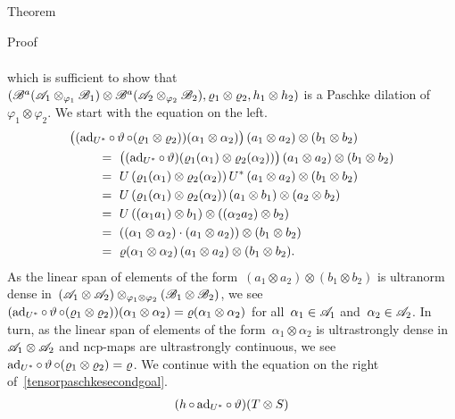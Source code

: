 \documentclass[b]{subfiles}
\begin{document}
\begin{parsec}
\begin{point}{Theorem}
\begin{point}{Proof}
\begin{point}
\begin{align}
    \end{align}
    which is sufficient to show that~$(
        \mathscr{B}^a(\mathscr{A}_1 \otimes_{\varphi_1} \mathscr{B}_1)
        \otimes \mathscr{B}^a(\mathscr{A}_2 \otimes_{\varphi_2} \mathscr{B}_2),
        \varrho_1 \otimes \varrho_2,
        h_1 \otimes h_2)$
    is a Paschke dilation of~$\varphi_1 \otimes \varphi_2$.
    We start with the equation on the left.
\begin{align*}
    &\bigl((\ad_{U^*} \after \vartheta \after  (\varrho_1 \otimes \varrho_2)) (\alpha_1 \otimes \alpha_2)\bigr)
    \, (a_1 \otimes a_2) \otimes (b_1 \otimes b_2) \\
    &\qquad \ = \ 
    \bigl((\ad_{U^*} \after \vartheta) (\varrho_1 (\alpha_1)\otimes \varrho_2(\alpha_2)) \bigr)
    \, (a_1 \otimes a_2) \otimes (b_1 \otimes b_2) \\
    &\qquad \ = \ 
    U \,(\varrho_1 (\alpha_1)\otimes \varrho_2(\alpha_2)) \, U^*
    \, (a_1 \otimes a_2) \otimes (b_1 \otimes b_2) \\
    &\qquad \ = \ 
    U \,(\varrho_1 (\alpha_1)\otimes \varrho_2(\alpha_2)) 
    \, (a_1 \otimes b_1) \otimes (a_2 \otimes b_2) \\
    &\qquad \ = \ 
    U \,  ((\alpha_1 a_1) \otimes b_1) \otimes ((\alpha_2 a_2) \otimes b_2) \\
    &\qquad \ = \ 
     ((\alpha_1 \otimes \alpha_2)\cdot (a_1 \otimes a_2)) \otimes (b_1 \otimes b_2) \\
    &\qquad \ = \ 
    \varrho(\alpha_1 \otimes\alpha_2) \,(a_1 \otimes a_2) \otimes (b_1 \otimes b_2).
\end{align*}
As the linear span of
    elements of the form~$(a_1 \otimes a_2) \otimes (b_1 \otimes b_2)$
    is ultranorm dense in~$(\mathscr{A}_1 \otimes \mathscr{A}_2)
                            \otimes_{\varphi_1 \otimes \varphi_2}
                            (\mathscr{B}_1 \otimes \mathscr{B}_2) $,
    we see~$(\mathrm{ad}_{U^*} \mathop{\circ} \vartheta \mathop{\circ} (\varrho_1 \otimes \varrho_2))
            (\alpha_1 \otimes \alpha_2)
            = \varrho(\alpha_1 \otimes \alpha_2)$
            for all~$\alpha_1\in\mathscr{A}_1$ and~$\alpha_2\in\mathscr{A}_2$.
In turn, as the linear span of elements of the form~$\alpha_1 \otimes \alpha_2$
    is ultrastrongly dense in~$\mathscr{A}_1 \otimes \mathscr{A}_2$
    and ncp-maps are ultrastrongly continuous,
    we see~$\mathrm{ad}_{U^*} \mathop{\circ} \vartheta \mathop{\circ} (\varrho_1 \otimes \varrho_2) =
        \varrho$.
        We continue with the equation on the right
        of~\eqref{tensorpaschkesecondgoal}.
\begin{align*}
    (h \after \ad_{U^*} \after \vartheta) (T \otimes S)

\end{align*}
\end{point}
\end{point}
\end{point}
\end{parsec}
\end{document}
